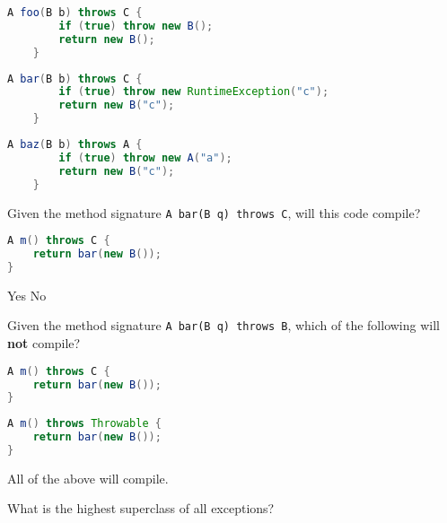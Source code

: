 \documentclass[addpoints,9pt]{exam}
\begin{document}
\begin{questions}
\begin{choices}
\correctchoice
\begin{lstlisting}[language=Java]
    A foo(B b) throws C {
        if (true) throw new B();
        return new B();
    }
\end{lstlisting}

\choice
\begin{lstlisting}[language=Java]
    A bar(B b) throws C {
        if (true) throw new RuntimeException("c");
        return new B("c");
    }
\end{lstlisting}

\choice
\begin{lstlisting}[language=Java]
    A baz(B b) throws A {
        if (true) throw new A("a");
        return new B("c");
    }
\end{lstlisting}
\end{choices}

\question[3] Given the method signature {\tt A bar(B q) throws C}, will this code
 compile?
\begin{lstlisting}[language=Java]
A m() throws C {
    return bar(new B());
}
\end{lstlisting}

\begin{choices}
\correctchoice Yes
\choice No
\end{choices}

\question[3] Given the method signature {\tt A bar(B q) throws B}, which of the following will {\bf not} compile?

\begin{choices}
\correctchoice
\begin{lstlisting}[language=Java]
A m() throws C {
    return bar(new B());
}
\end{lstlisting}

\choice
\begin{lstlisting}[language=Java]
A m() throws Throwable {
    return bar(new B());
}
\end{lstlisting}

\choice All of the above will compile.
\end{choices}

\question[3] What is the highest superclass of all exceptions?

\begin{choices}
\end{choices}




\end{questions}
\end{document}
